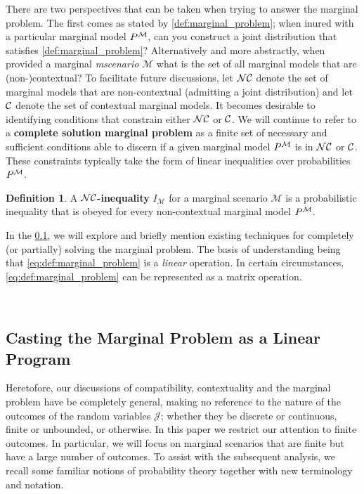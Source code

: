 \documentclass[aps, 10pt, english, twoside, pra, nofootinbib, longbibliography]{revtex4-1}
\theoremstyle{plain}
\theoremstyle{definition}
\newtheorem{definition}[theorem]{Definition}
\theoremstyle{remark}
\newcommand{\mscenario}{\mathcal{M}}
\newcommand{\jointvar}{\mathcal{J}}
\newcommand{\term}[1]{\textcolor{Mahogany}{\textbf{#1}}}
\begin{document}
    There are two perspectives that can be taken when trying to answer the marginal problem. The first comes as stated by \cref{def:marginal_problem}; when inured with a particular marginal model $\prob^{\mscenario}$, can you construct a joint distribution that satisfies \cref{def:marginal_problem}? Alternatively and more abstractly, when provided a marginal \textit{mscenario} $\mscenario$ what is the set of all marginal models that are (non-)contextual? To facilitate future discussions, let $\mathcal{NC}$ denote the set of marginal models that are non-contextual (admitting a joint distribution) and let $\mathcal{C}$ denote the set of contextual marginal models. It becomes desirable to identifying conditions that constrain either $\mathcal{NC}$ or $\mathcal{C}$. We will continue to refer to a \term{complete solution marginal problem} as a finite set of necessary and sufficient conditions able to discern if a given marginal model $\prob^{\mscenario}$ is in $\mathcal{NC}$ or $\mathcal{C}$. These constraints typically take the form of linear inequalities over probabilities $\prob^{\mscenario}$.

    \begin{definition}
        A \term{$\mathcal{NC}$-inequality} $I_{\mscenario}$ for a marginal scenario $\mscenario$ is a probabilistic inequality that is obeyed for every non-contextual marginal model $\prob^{\mscenario}$.
    \end{definition}

    In the \cref{sec:linear_program}, we will explore and briefly mention existing techniques for completely (or partially) solving the marginal problem. The basis of understanding being that \cref{eq:def:marginal_problem} is a \textit{linear} operation. In certain circumstances, \cref{eq:def:marginal_problem} can be represented as a matrix operation.

     \\

    \subsection{Casting the Marginal Problem as a Linear Program}
    \label{sec:linear_program}

    Heretofore, our discussions of compatibility, contextuality and the marginal problem have be completely general, making no reference to the nature of the outcomes of the random variables $\jointvar$; whether they be discrete or continuous, finite or unbounded, or otherwise.  In this paper we restrict our attention to finite outcomes. In particular, we will focus on marginal scenarios that are finite but have a large number of outcomes. To assist with the subsequent analysis, we recall some familiar notions of probability theory together with new terminology and notation. \\
\end{document}
